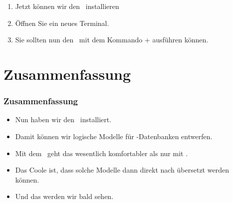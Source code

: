 \documentclass[aspectratio=169,mathserif,notheorems]{beamer}%
\begin{document}
\begin{frame}[t]
\begin{itemize}
{\begin{enumerate}
{\begin{enumerate}
%
\item<16-> Schreiben Sie  und drücken Sie~\keys{\enter}.%
%
\item<17-> Nachdem die Installation fertig ist, schließen Sie das Terminal.%
\end{enumerate}%
}%
%
\setcounter{enumi}{5}%
\item<18-> Jetzt können wir den \pgmodeler\ installieren%
%
\setcounter{enumi}{6}%
\item<23-> Öffnen Sie ein neues Terminal.%
%
\setcounter{enumi}{7}%
\item<24-> Sie sollten nun den \pgmodeler\ mit dem Kommando  + \keys{\enter} ausführen können.%
%
\end{enumerate}}%
\end{itemize}%
\end{frame}%
%
\section{Zusammenfassung}%
%
\begin{frame}%
\frametitle{Zusammenfassung}%
\begin{itemize}%
\item Nun haben wir den \pgmodeler\ installiert.%
\item<2-> Damit können wir logische Modelle für \postgresql-Datenbanken entwerfen.%
\item<3-> Mit dem \pgmodeler\ geht das wesentlich komfortabler als nur mit .%
\item<4-> Das Coole ist, dass solche Modelle dann direkt nach  übersetzt werden können.%
\item<5-> Und das werden wir bald sehen.%
\end{itemize}%
\end{frame}%
%
\endPresentation%
\end{document}
